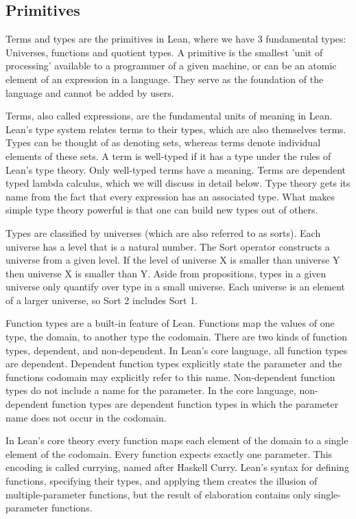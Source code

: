 \documentclass{article}
\newcommand{\1}{\mathbbm{1}}
\theoremstyle{plain}
\theoremstyle{definition}
\numberwithin{equation}{section}
\begin{document}
\subsection{Primitives}

Terms and types are the primitives in Lean, where we have 3 fundamental types: Universes, functions and quotient types. A primitive is the smallest 'unit of processing' available to a programmer of a given machine, or can be an atomic element of an expression in a language. They serve as the foundation of the language and cannot be added by users. 

Terms, also called expressions, are the fundamental units of meaning in Lean.  Lean's type system relates terms to their types, which are also themselves terms. Types can be thought of as denoting sets, whereas terms denote individual elements of these sets. A term is well-typed if it has a type under the rules of Lean's type theory. Only well-typed terms have a meaning. Terms are dependent typed lambda calculus, which we will discuss  in detail below. Type theory gets its name from the fact that every expression has an associated type. What makes simple type theory powerful is that one can build new types out of others. 

Types are classified by universes (which are also referred to as sorts). Each universe has a level that is a natural number. The Sort operator constructs a universe from a given level. If the level of universe X is smaller than universe Y then universe X is smaller than Y.  Aside from propositions, types in a given universe only quantify over type in a small universe. Each universe is an element of a larger universe, so Sort 2 includes Sort 1. 

Function types are a built-in feature of Lean. Functions map the values of one type, the domain, to another type the codomain. There are two kinds of function types, dependent, and non-dependent. In Lean’s core language, all function types are dependent. Dependent function types explicitly state the parameter and the functions codomain may explicitly refer to this name. Non-dependent function types do not include a name for the parameter. In the core language, non-dependent function types are dependent function types in which the parameter name does not occur in the codomain.

In Lean’s core theory every function maps each element of the domain to a single element of the codomain. Every function expects exactly one parameter. This encoding is called currying, named after Haskell Curry. Lean's syntax for defining functions, specifying their types, and applying them creates the illusion of multiple-parameter functions, but the result of elaboration contains only single-parameter functions.
\end{document}

